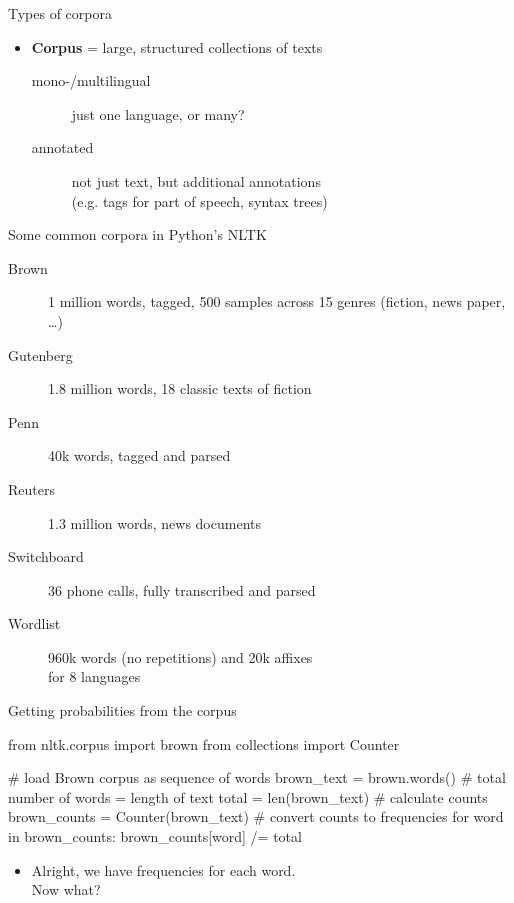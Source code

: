 \documentclass[professionalfonts, xcolor={usenames,svgnames,x11names,table}]{beamer}
\begin{document}
\begin{frame}{Types of corpora}
    \begin{itemize}
        \item \textbf{Corpus} = large, structured collections of texts
        \begin{description}
            \item[mono-\slash multilingual] just one language, or many?
            \item[annotated] not just text, but additional annotations\\
                             (e.g. tags for part of speech, syntax trees)
        \end{description}
    \end{itemize}

    \begin{block}{Some common corpora in Python's NLTK}
        \begin{description}
            \item[Brown] 1 million words, tagged, 500 samples across 15 genres (fiction, news paper, \ldots)
            \item[Gutenberg] 1.8 million words, 18 classic texts of fiction
            \item[Penn] 40k words, tagged and parsed
            \item[Reuters] 1.3 million words, news documents
            \item[Switchboard] 36 phone calls, fully transcribed and parsed
            \item[Wordlist] 960k words (no repetitions) and 20k affixes\\
                            for 8 languages
        \end{description}
    \end{block}
\end{frame}

\begin{frame}[fragile]{Getting probabilities from the corpus}
    \begin{pythoncode}
        from nltk.corpus import brown
        from collections import Counter

        # load Brown corpus as sequence of words
        brown_text = brown.words()
        # total number of words = length of text
        total = len(brown_text)
        # calculate counts
        brown_counts = Counter(brown_text)
        # convert counts to frequencies
        for word in brown_counts:
            brown_counts[word] /= total
    \end{pythoncode}

    \begin{itemize}
        \item Alright, we have frequencies for each word.\\
              Now what?
    \end{itemize}
\end{frame}
\end{document}
